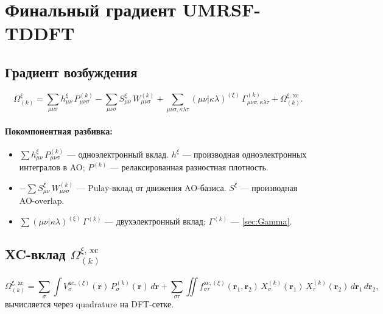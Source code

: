 \documentclass[11pt, a4paper]{article}
\theoremstyle{definition}
\newcommand{\xc}{\text{xc}}
\begin{document}
\section{Финальный градиент UMRSF-TDDFT}
\label{sec:gradient}

\subsection{Градиент возбуждения}

\begin{equation}
    \boxed{
        \Omega^\xi_{(k)} = \sum_{\mu\nu\sigma} h^\xi_{\mu\nu}\, P^{(k)}_{\mu\nu\sigma} - \sum_{\mu\nu\sigma} S^\xi_{\mu\nu}\, W^{(k)}_{\mu\nu\sigma} + \sum_{\mu\nu\sigma, \kappa\lambda\tau} (\mu\nu | \kappa\lambda)^{(\xi)}\, \Gamma^{(k)}_{\mu\nu\sigma, \kappa\lambda\tau} + \Omega^{\xi,\,\xc}_{(k)}.
    }
    \label{eq:OmegaXi}
\end{equation}

\paragraph{Покомпонентная разбивка:}
\begin{itemize}
    \item $\sum h^\xi_{\mu\nu}\, P^{(k)}_{\mu\nu\sigma}$ --- одноэлектронный вклад. $h^\xi$ --- производная одноэлектронных интегралов в AO; $P^{(k)}$ --- релаксированная разностная плотность.
    \item $-\sum S^\xi_{\mu\nu}\, W^{(k)}_{\mu\nu\sigma}$ --- Pulay-вклад от движения AO-базиса. $S^\xi$ --- производная AO-overlap.
    \item $\sum (\mu\nu | \kappa\lambda)^{(\xi)}\, \Gamma^{(k)}$ --- двухэлектронный вклад; $\Gamma^{(k)}$ --- \cref{sec:Gamma}.
\end{itemize}

\subsection{XC-вклад $\Omega^{\xi,\,\xc}_{(k)}$}

\begin{equation}
    \Omega^{\xi,\,\xc}_{(k)} = \sum_\sigma \int V^{\xc, (\xi)}_\sigma(\mathbf r)\, P^{(k)}_\sigma(\mathbf r)\, d\mathbf r + \sum_{\sigma\tau} \iint f^{\xc, (\xi)}_{\sigma\tau}(\mathbf r_1, \mathbf r_2)\, X^{(k)}_\sigma(\mathbf r_1)\, X^{(k)}_\tau(\mathbf r_2)\, d\mathbf r_1\, d\mathbf r_2,
\end{equation}
вычисляется через quadrature на DFT-сетке.
\end{document}

